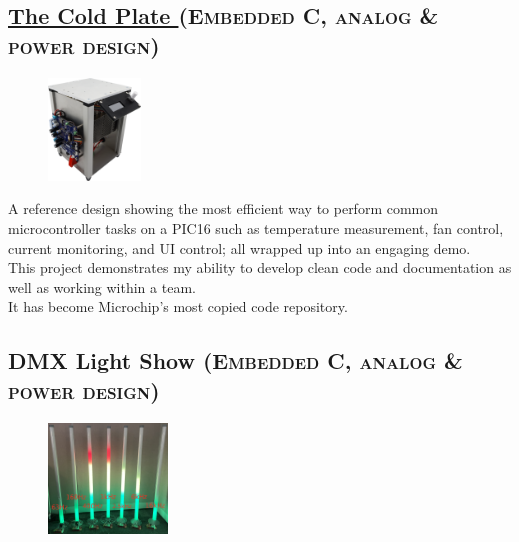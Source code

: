 \documentclass[
	10pt, %
]{FreemanCV}
\begin{document}
\begin{paracol}{2} %

\vspace*{-10pt}
\leavevmode \subsection{\href{https://github.com/microchip-pic-avr-examples/pic16f17146-cold-plate-mplab-mcc}{The Cold Plate \linkcolor\scriptsize\faLink}
\hfill
\textsc{\footnotesize{(Embedded C, analog \& power design)}}}

\setlength\intextsep{0pt} %
\begin{figure} %
	\hspace*{-5pt} %
    \includegraphics[width=70pt]{cold_plate} %
\end{figure}

A reference design showing the most efficient way to perform common microcontroller tasks on a PIC16
such as temperature measurement, fan control, current monitoring, and UI control;
all wrapped up into an engaging demo.\\

This project demonstrates my ability to develop clean code and documentation as well as working within a team.\\
It has become Microchip's most copied code repository.


\vspace*{-10pt} %
\leavevmode\subsection{DMX Light Show
\hfill
\textsc{\footnotesize{(Embedded C, analog \& power design)}}}

\setlength\intextsep{-5pt} %
\begin{figure} %
	\hspace*{-5pt} %
    \includegraphics[width=90pt]{dmx} %
\end{figure}


\end{paracol}
\end{document}
